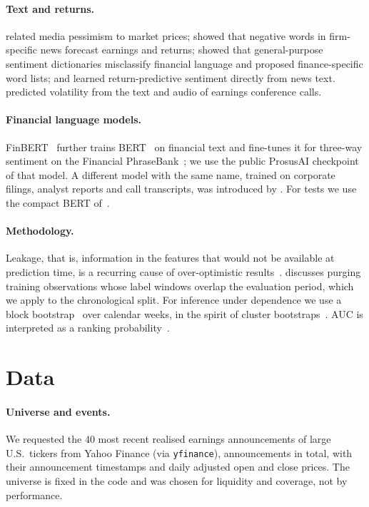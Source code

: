 \documentclass[11pt]{article}
\begin{document}
\paragraph{Text and returns.} \citet{tetlock2007} related media pessimism to market prices;
\citet{tetlock2008} showed that negative words in firm-specific news forecast earnings and
returns; \citet{loughran2011} showed that general-purpose sentiment dictionaries misclassify
financial language and proposed finance-specific word lists; and \citet{ke2019} learned
return-predictive sentiment directly from news text. \citet{qin2019} predicted volatility from
the text and audio of earnings conference calls.
\paragraph{Financial language models.} FinBERT~\citep{araci2019} further trains
BERT~\citep{devlin2019} on financial text and fine-tunes it for three-way sentiment on the
Financial PhraseBank~\citep{malo2014}; we use the public ProsusAI checkpoint of that model. A
different model with the same name, trained on corporate filings, analyst reports and call
transcripts, was introduced by \citet{huang2023}. For tests we use the compact BERT
of~\citet{turc2019}.
\paragraph{Methodology.} Leakage, that is, information in the features that would not be
available at prediction time, is a recurring cause of over-optimistic results~\citep{kaufman2012}.
\citet{lopezdeprado2018} discusses purging training observations whose label windows overlap the
evaluation period, which we apply to the chronological split. For inference under dependence we
use a block bootstrap~\citep{kunsch1989} over calendar weeks, in the spirit of cluster
bootstraps~\citep{cameron2008}. AUC is interpreted as a ranking probability~\citep{hanley1982}.

\section{Data}\label{sec:data}
\paragraph{Universe and events.} We requested the 40 most recent realised earnings
announcements of \nTickers{} large U.S.\ tickers from Yahoo Finance (via \texttt{yfinance}),
\nAnnouncements{} announcements in total, with their announcement timestamps and daily adjusted
open and close prices. The universe is fixed in the code and was chosen for liquidity and
coverage, not by performance.
\end{document}

